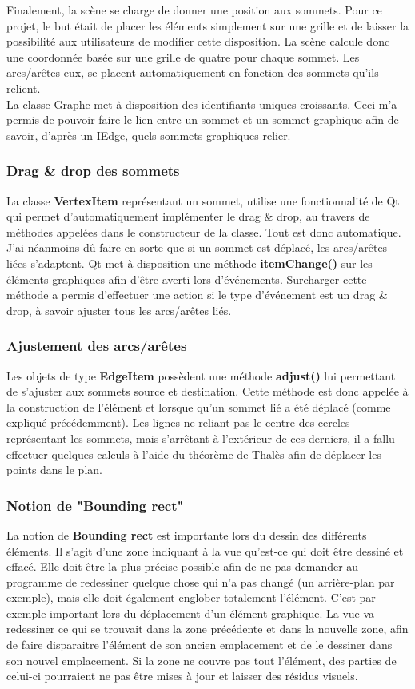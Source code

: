 \documentclass[french]{article}
\begin{document}
	Finalement, la scène se charge de donner une position aux sommets. Pour ce projet, le but était de placer les éléments simplement sur une grille et de laisser la possibilité aux utilisateurs de modifier cette disposition. La scène calcule donc une coordonnée basée sur une grille de quatre pour chaque sommet. Les arcs/arêtes eux, se placent automatiquement en fonction des sommets qu'ils relient. \\
	La classe Graphe met à disposition des identifiants uniques croissants. Ceci m'a permis de pouvoir faire le lien entre un sommet et un sommet graphique afin de savoir, d'après un IEdge, quels sommets graphiques relier.
	
	\subsubsection{Drag \& drop des sommets}
	La classe \textbf{VertexItem} représentant un sommet, utilise une fonctionnalité de Qt qui permet d'automatiquement implémenter le drag \& drop, au travers de méthodes appelées dans le constructeur de la classe. Tout est donc automatique. \\
	J'ai néanmoins dû faire en sorte que si un sommet est déplacé, les arcs/arêtes liées s'adaptent. Qt met à disposition une méthode \textbf{itemChange()} sur les éléments graphiques afin d'être averti lors d'événements. Surcharger cette méthode a permis d'effectuer une action si le type d'événement est un drag \& drop, à savoir ajuster tous les arcs/arêtes liés.
	
	\subsubsection{Ajustement des arcs/arêtes}
	Les objets de type \textbf{EdgeItem} possèdent une méthode \textbf{adjust()} lui permettant de s'ajuster aux sommets source et destination. Cette méthode est donc appelée à la construction de l'élément et lorsque qu'un sommet lié a été déplacé (comme expliqué précédemment). Les lignes ne reliant pas le centre des cercles représentant les sommets, mais s'arrêtant à l'extérieur de ces derniers, il a fallu effectuer quelques calculs à l'aide du théorème de Thalès afin de déplacer les points dans le plan.
	
	\subsubsection{Notion de "Bounding rect"}
	La notion de \textbf{Bounding rect} est importante lors du dessin des différents éléments. Il s'agit d'une zone indiquant à la vue qu'est-ce qui doit être dessiné et effacé. Elle doit être la plus précise possible afin de ne pas demander au programme de redessiner quelque chose qui n'a pas changé (un arrière-plan par exemple), mais elle doit également englober totalement l'élément. C'est par exemple important lors du déplacement d'un élément graphique. La vue va redessiner ce qui se trouvait dans la zone précédente et dans la nouvelle zone, afin de faire disparaitre l'élément de son ancien emplacement et de le dessiner dans son nouvel emplacement. Si la zone ne couvre pas tout l'élément, des parties de celui-ci pourraient ne pas être mises à jour et laisser des résidus visuels.
	
\end{document}
